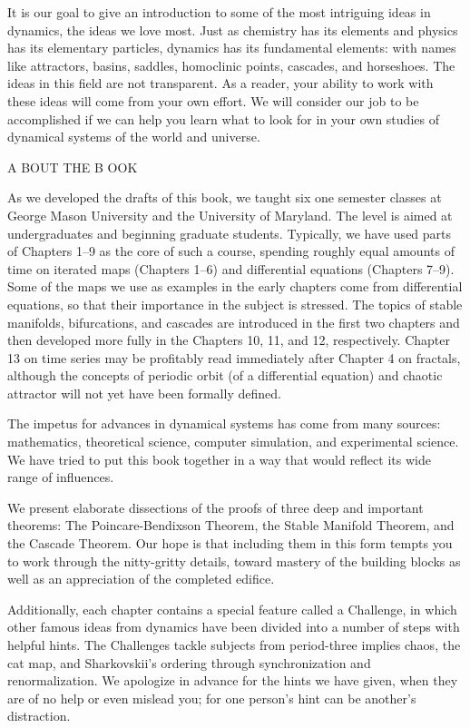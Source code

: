\documentclass[12pt]{article}
\begin{document}
It is our goal to give an introduction to some of the most intriguing ideas in dynamics, the ideas we love 
most. Just as chemistry has its elements and physics has its elementary particles, dynamics has its 
fundamental elements: with names like attractors, basins, saddles, homoclinic points, cascades, and 
horseshoes. The ideas in this field are not transparent. As a reader, your ability to work with these ideas 
will come from your own effort. We will consider our job to be accomplished if we can help you learn what 
to look for in your own studies of dynamical systems of the world and universe.

A BOUT THE B OOK

As we developed the drafts of this book, we taught six one semester classes at George Mason University and 
the University of Maryland. The level is aimed at undergraduates and beginning graduate students. 
Typically, we have used parts of Chapters 1–9 as the core of such a course, spending roughly equal amounts 
of time on iterated maps (Chapters 1–6) and differential equations (Chapters 7–9). Some of the maps we use 
as examples in the early chapters come from differential equations, so that their importance in the subject 
is stressed. The topics of stable manifolds, bifurcations, and cascades are introduced in the first two 
chapters and then developed more fully in the Chapters 10, 11, and 12, respectively. Chapter 13 on time 
series may be profitably read immediately after Chapter 4 on fractals, although the concepts of periodic 
orbit (of a differential equation) and chaotic attractor will not yet have been formally defined.

The impetus for advances in dynamical systems has come from many sources: mathematics, theoretical science, 
computer simulation, and experimental science. We have tried to put this book together in a way that would reflect its wide range of 
influences.

We present elaborate dissections of the proofs of three deep and important theorems: The 
Poincare-Bendixson Theorem, the Stable Manifold Theorem, and the Cascade Theorem. Our hope is that 
including them in this form tempts you to work through the nitty-gritty details, toward mastery of the 
building blocks as well as an appreciation of the completed edifice.

Additionally, each chapter contains a special feature called a Challenge, in which other famous ideas from 
dynamics have been divided into a number of steps with helpful hints. The Challenges tackle subjects from 
period-three implies chaos, the cat map, and Sharkovskii’s ordering through synchronization and 
renormalization. We apologize in advance for the hints we have given, when they are of no help or even 
mislead you; for one person’s hint can be another’s distraction.
\end{document}
